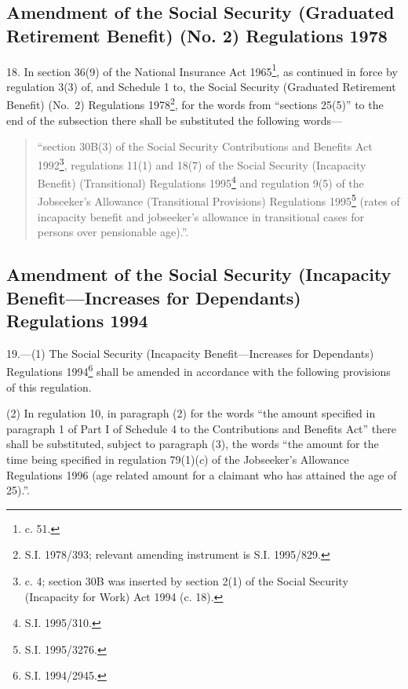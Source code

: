 \documentclass[a4paper]{article}
\begin{document}
\subsection[18. Amendment of the Social Security (Graduated Retirement Benefit) (No. 2) Regulations 1978]{Amendment of the Social Security (Graduated Retirement Benefit) (No. 2) Regulations 1978}

18.  In section 36(9) of the National Insurance Act 1965\footnote{ c. 51.}, as continued in force by regulation 3(3) of, and Schedule 1 to, the Social Security (Graduated Retirement Benefit) (No.\ 2) Regulations 1978\footnote{\frenchspacing S.I. 1978/393; relevant amending instrument is S.I. 1995/829.}, for the words from “sections 25(5)” to the end of the subsection there shall be substituted the following words—
\begin{quotation}
“section 30B(3) of the Social Security Contributions and Benefits Act 1992\footnote{ c. 4; section 30B was inserted by section 2(1) of the Social Security (Incapacity for Work) Act 1994 (c. 18).}, regulations 11(1) and 18(7) of the Social Security (Incapacity Benefit) (Transitional) Regulations 1995\footnote{\frenchspacing S.I. 1995/310.} and regulation 9(5) of the Jobseeker’s Allowance (Transitional Provisions) Regulations 1995\footnote{\frenchspacing S.I. 1995/3276.} (rates of incapacity benefit and jobseeker’s allowance in transitional cases for persons over pensionable age).”.
\end{quotation}

\subsection[19. Amendment of the Social Security (Incapacity Benefit—Increases for Dependants) Regulations 1994]{\sloppy Amendment of the Social Security (Incapacity Benefit—\hspace{0pt}Increases for Dependants) Regulations 1994}

19.—(1) The Social Security (Incapacity Benefit—Increases for Dependants) Regulations 1994\footnote{\frenchspacing S.I. 1994/2945.} shall be amended in accordance with the following provisions of this regulation.

(2) In regulation 10, in paragraph (2) for the words “the amount specified in paragraph 1 of Part I of Schedule 4 to the Contributions and Benefits Act” there shall be substituted, subject to paragraph (3), the words “the amount for the time being specified in regulation 79(1)($c$) of the Jobseeker’s Allowance Regulations 1996 (age related amount for a claimant who has attained the age of 25).”.
\end{document}

